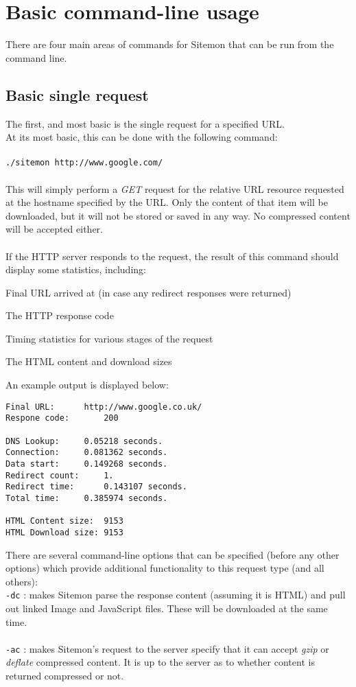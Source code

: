 \documentclass[a4paper]{article}
\newenvironment{small_list}{
\begin{itemize}
  \setlength{\itemsep}{0pt}
  \setlength{\parskip}{0pt}
  \setlength{\parsep}{0pt}
}
{\end{itemize}}
\begin{document}
\pagebreak

\section{Basic command-line usage}

There are four main areas of commands for Sitemon that can be run from the command line.
\subsection{Basic single request}
The first, and most basic is the single request for a specified URL.\\
At its most basic, this can be done with the following command:\\\\
{\tt ./sitemon http://www.google.com/}\\\\
This will simply perform a {\em GET} request for the relative URL resource requested at the hostname specified by the URL. Only the
 content of that item will be downloaded, but it will not be stored or saved in any way. No compressed content will be 
 accepted either.\\\\If the HTTP server responds to the request, the result of this command should display some statistics, including:
\begin{small_list}
	\item Final URL arrived at (in case any redirect responses were returned)
	\item The HTTP response code
	\item Timing statistics for various stages of the request
	\item The HTML content and download sizes
\end{small_list}

An example output is displayed below:
\begin{verbatim}
Final URL:		http://www.google.co.uk/
Respone code:		200

DNS Lookup:		0.05218 seconds.
Connection:		0.081362 seconds.
Data start:		0.149268 seconds.
Redirect count:		1.
Redirect time:		0.143107 seconds.
Total time:		0.385974 seconds.

HTML Content size:	9153
HTML Download size:	9153
\end{verbatim}

There are several command-line options that can be specified (before any other options) which provide additional functionality to this
 request type (and all others):\\
{\tt -dc} : makes Sitemon parse the response content (assuming it is HTML) and pull out linked Image and JavaScript files. These will be
 downloaded at the same time.\\\\
{\tt -ac} : makes Sitemon's request to the server specify that it can accept {\em gzip} or {\em deflate} compressed content. It is up to
 the server as to whether content is returned compressed or not.
\end{document}
